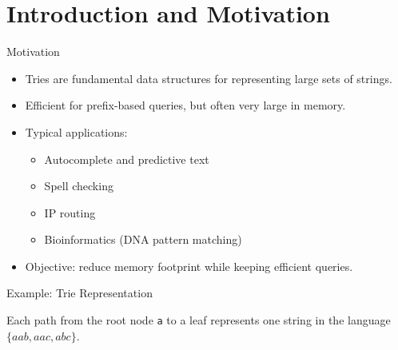 \documentclass[aspectratio=169]{beamer}
\begin{document}
\begin{frame}[plain]
  \titlepage
\end{frame}



\section{Introduction and Motivation}
\begin{frame}{Motivation}
  \begin{itemize}
    \item Tries are fundamental data structures for representing large sets of strings.
    \item Efficient for prefix-based queries, but often very large in memory.
    \item Typical applications:
      \begin{itemize}
        \item Autocomplete and predictive text
        \item Spell checking
        \item IP routing
        \item Bioinformatics (DNA pattern matching)
      \end{itemize}
    \item Objective: reduce memory footprint while keeping efficient queries.
  \end{itemize}
\end{frame}

\begin{frame}{Example: Trie Representation}
\centering
{}

\vspace{0.3cm}
\small
Each path from the root node \texttt{a} to a leaf represents one string in the language 
$\{aab, aac, abc\}$.
\end{frame}
\end{document}
